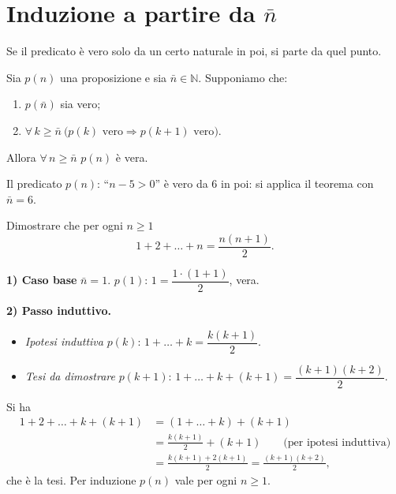\documentclass[11pt,a4paper]{article}
\begin{document}
\section{Induzione a partire da $\bar n$}

Se il predicato è vero solo da un certo naturale in poi, si parte da
quel punto.

\begin{teorema}
Sia $p(n)$ una proposizione e sia $\bar n \in \mathbb{N}$. Supponiamo che:
\begin{enumerate}
    \item $p(\bar n)$ sia vero;
    \item $\forall\, k \geq \bar n \ \big(p(k) \text{ vero} \Rightarrow
          p(k+1) \text{ vero}\big)$.
\end{enumerate}
Allora $\forall\, n \geq \bar n$ $p(n)$ è vera.
\end{teorema}

\begin{esempio}
Il predicato $p(n)$: ``$n - 5 > 0$'' è vero da $6$ in poi: si applica il
teorema con $\bar n = 6$.
\end{esempio}

\begin{esempio}
Dimostrare che per ogni $n \geq 1$
\[
1 + 2 + \dots + n = \frac{n(n+1)}{2}. \tag*{$p(n)$}
\]

\textbf{1) Caso base} $\bar n = 1$. $p(1)$: $1 = \dfrac{1 \cdot (1+1)}{2}$,
vera.

\textbf{2) Passo induttivo.}
\begin{itemize}
    \item \emph{Ipotesi induttiva} $p(k)$:
          $1 + \dots + k = \dfrac{k(k+1)}{2}$.
    \item \emph{Tesi da dimostrare} $p(k+1)$:
          $1 + \dots + k + (k+1) = \dfrac{(k+1)(k+2)}{2}$.
\end{itemize}
Si ha
\begin{align*}
1 + 2 + \dots + k + (k+1) &= (1 + \dots + k) + (k+1)\\
&= \frac{k(k+1)}{2} + (k+1) \qquad \text{(per ipotesi induttiva)}\\
&= \frac{k(k+1) + 2(k+1)}{2} = \frac{(k+1)(k+2)}{2},
\end{align*}
che è la tesi. Per induzione $p(n)$ vale per ogni $n \geq 1$.
\end{esempio}
\end{document}
